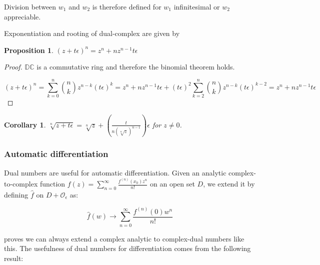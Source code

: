 \documentclass{article}
\newtheorem{proposition}[theorem]{Proposition}
\newtheorem{corollary}[theorem]{Corollary}
\newcommand{\DC}{\mathbb{DC}}
\newcommand{\Z}{\mathcal{O}_\e}
\newcommand{\e}{\epsilon}
\begin{document}
Division between $w_1$ and $w_2$ is therefore defined for $w_1$ infinitesimal or $w_2$ appreciable.

Exponentiation and rooting of dual-complex are given by

\begin{proposition}
$(z + t\e)^n = z^n + n z^{n-1} t \e$
\end{proposition}
\begin{proof}
$\DC$ is a commutative ring and therefore the binomial theorem holds.

\noindent \begin{equation}
(z + t\e)^n = \sum_{k=0}^n \binom{n}{k} z^{n-k}(t\e)^k = z^n + nz^{n-1}t\e + (t\e)^2 \sum_{k=2}^n \binom{n}{k} z^{n-k}(t\e)^{k-2} = z^n + nz^{n-1}t\e
\end{equation}
\end{proof}

\begin{corollary}
$\sqrt[n]{z + t \e} = \sqrt[n]{z} + (\frac{t}{n(\sqrt[n]{z})^{n-1}}) \e$ for $z \neq 0$.
\end{corollary}

\subsubsection*{Automatic differentiation}

Dual numbers are useful for automatic differentiation. Given an analytic complex-to-complex function $f(z) = \sum_{n=0}^\infty \frac{f^{(n)}(x_0) z^n}{n!}$ on an open set $D$, we extend it by defining $\hat{f}$ on $D + \Z$ as:

\begin{equation}
        \hat{f}(w) \to \sum_{n=0}^\infty \frac{f^{(n)}(0) w^n}{n!}
\end{equation}

\cite{messelmi2015} proves we can always extend a complex analytic to complex-dual numbers like this.
The usefulness of dual numbers for differentiation comes from the following result:
\end{document}
